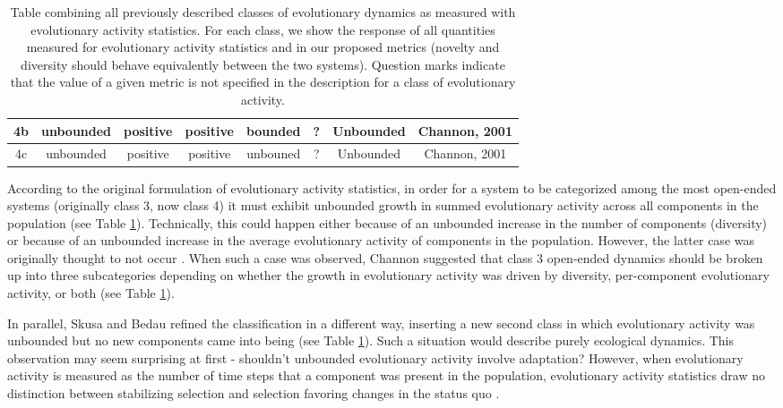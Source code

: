 \documentclass[letterpaper]{article}
\begin{document}
\begin{table}[]
\begin{tabular}{|c|c|c|c|c|c|c|c|}
4b             & unbounded                                                                                 & positive        & positive                                                             & bounded                                                            & ?                   & Unbounded                                                                                 & Channon, 2001         \\ \hline
4c             & unbounded                                                                                 & positive        & positive                                                             & unbouned                                                           & ?                   & Unbounded                                                                                 & Channon, 2001         \\ \hline
\end{tabular}
\caption{Table combining all previously described classes of evolutionary dynamics as measured with evolutionary activity statistics. For each class, we show the response of all quantities measured for evolutionary activity statistics and in our proposed metrics (novelty and diversity should behave equivalently between the two systems). Question marks indicate that the value of a given metric is not specified in the description for a class of evolutionary activity.}
\label{eastats}
\end{table}


According to the original formulation of evolutionary activity statistics, in order for a system to be categorized among the most open-ended systems (originally class 3, now class 4) it must exhibit unbounded growth in summed evolutionary activity across all components in the population \citep{bedau_comparison_1997} (see Table \ref{eastats}). Technically, this could happen either because of an unbounded increase in the number of components (diversity) or because of an unbounded increase in the average evolutionary activity of components in the population. However, the latter case was originally thought to not occur \citep{bedau_classification_1998}. When such a case was observed, Channon suggested that class 3 open-ended dynamics should be broken up into three subcategories depending on whether the growth in evolutionary activity was driven by diversity, per-component evolutionary activity, or both \citep{channon_passing_2001} (see Table \ref{eastats}). 

In parallel, Skusa and Bedau refined the classification in a different way, inserting a new second class in which evolutionary activity was unbounded but no new components came into being \citep{skusa_towards_2003} (see Table \ref{eastats}). Such a situation would describe purely ecological dynamics. This observation may seem surprising at first - shouldn't unbounded evolutionary activity involve adaptation? However, when evolutionary activity is measured as the number of time steps that a component was present in the population, evolutionary activity statistics draw no distinction between stabilizing selection and selection favoring changes in the status quo \citep{channon_improving_2003}.  
\end{document}
